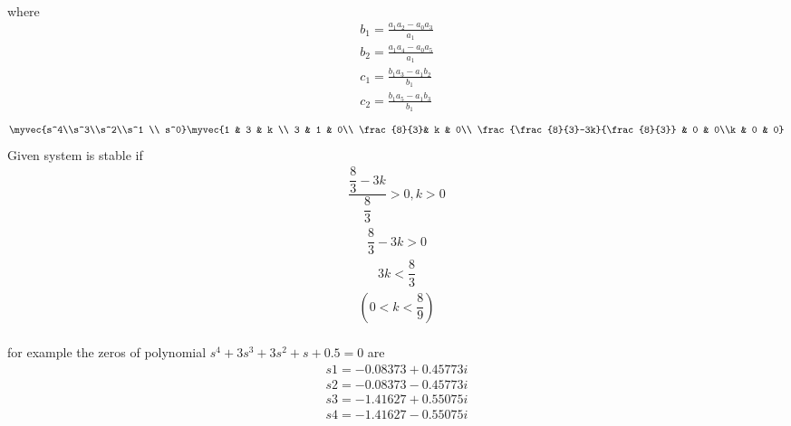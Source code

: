 \begin{enumerate}[label=\thesection.\arabic*.,ref=\thesection.\theenumi]
 \\
 where
 \begin{align}
 b_1 =\frac{ a_1a_2-a_0a_3}{a_1}  
 \\
 b_2 =\frac{ a_1a_4-a_0a_5}{a_1} 
 \\
 c_1=\frac{ b_1a_3-a_1b_2}{b_1} 
\\
 c_2=\frac{ b_1a_5-a_1b_3}{b_1}  
\end{align}
\bigskip
\begin{align}
\myvec{s^4\\s^3\\s^2\\s^1 \\ s^0}
\myvec{1 & 3 & k \\ 3 & 1 & 0\\  \frac{8}{3}& k & 0\\ \frac{\frac{8}{3}-3k}{\frac{8}{3}} & 0 & 0\\k & 0 & 0} 
\end{align}
Given system is stable if
\begin{align}
\dfrac{\dfrac{8}{3}-3k}{\dfrac{8}{3}}>0  ,  k>0
\end{align}
\begin{align}
{\dfrac{8}{3}-3k} >0
\end{align}
\begin{align}
3k<\dfrac{8}{3}
\end{align}
\begin{align}
(0<k<\dfrac{8}{9})
\end{align}
\bigskip
\\for example the zeros of polynomial $s^4+3s^3+3s^2+s+0.5=0$ are 
\begin{align}
s1=−0.08373+0.45773i
\end{align}
\begin{align}
s2=−0.08373-0.45773i
\end{align}
\begin{align}
s3=−1.41627+0.55075i
\end{align}
\begin{align}
s4=−1.41627-0.55075i
\end{align}

\end{enumerate}

